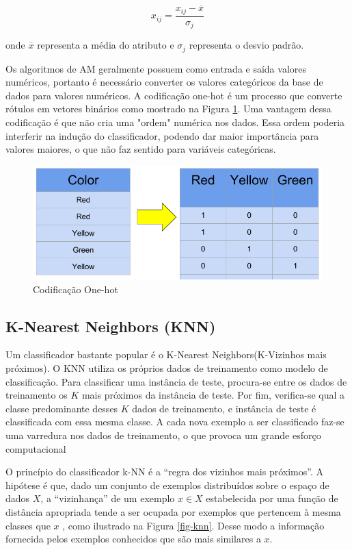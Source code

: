 \begin{equation}\label{eq-norm}
x_{ij} = \frac{x_{ij} - \overline{x}}{ \sigma_j}
\end{equation}

onde $\overline{x}$ representa a média do atributo e $\sigma_j$ representa o desvio padrão.

Os algoritmos de AM geralmente possuem como entrada e saída valores numéricos, portanto é necessário converter os valores categóricos da base de dados para valores numéricos. A codificação one-hot é um processo que converte rótulos em vetores binários como mostrado na Figura \ref{fig-onehot}. Uma vantagem dessa codificação é que não cria uma "ordem" numérica nos dados. Essa ordem poderia interferir na indução do classificador, podendo dar maior importância para valores maiores, o que não faz sentido para variáveis categóricas.

\begin{figure}[h]
	\centering
	\includegraphics[scale=0.5]{pasta1_figuras/one-hot.png}
	\caption{Codificação One-hot}
	\label{fig-onehot}
\end{figure}

\subsection{K-Nearest Neighbors (KNN)}
Um classificador bastante popular é o K-Nearest Neighbors(K-Vizinhos mais próximos). O KNN utiliza os próprios dados de treinamento como modelo de classificação. Para classificar uma instância de teste, procura-se entre os dados de treinamento os $K$ mais próximos da instância de teste. Por fim, verifica-se qual a classe predominante desses $K$ dados de treinamento, e instância de teste é classificada com essa mesma classe. A cada nova exemplo a ser classificado faz-se uma varredura nos dados de treinamento, o que provoca um grande esforço computacional

O princípio do classificador k-NN é a ``regra dos vizinhos mais próximos''. A hipótese é que, dado um conjunto de exemplos distribuídos sobre o espaço de dados $X$, a ``vizinhança'' de um exemplo $x \in X$ estabelecida por uma função de distância apropriada tende a ser ocupada por exemplos que pertencem à mesma classes que $x$ \cite{hart1967} , como ilustrado na Figura \ref{fig-knn}. Desse modo a informação fornecida pelos exemplos conhecidos que são mais similares a $x$.


